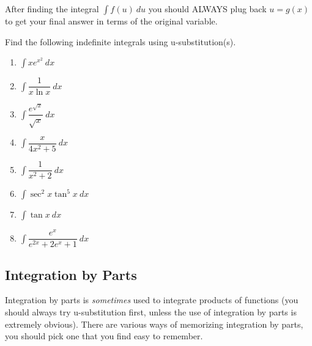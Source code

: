 \begin{remark}
	After finding the integral $\int f(u) \: du$ you should ALWAYS plug back $u = g(x)$ to get your final answer in terms of the original variable.
\end{remark}

\begin{exercise}
	Find the following indefinite integrals using u-substitution(s).
	\begin{multicols}{2}
		\begin{enumerate}
			\item $\int x e^{x^2} \: dx $
			\item $\int \dfrac{1}{x \ln x} \: dx$
			\item $\int \dfrac{e^{\sqrt{x}}}{\sqrt{x}} \: dx$
			\item $\int \dfrac{x}{4x^2+5} \: dx$
			\item $\int \dfrac{1}{x^2 + 2} \: dx$
			\item $\int \sec^2 x \tan^5 x \: dx$
			\item $\int \tan x \: dx$
			\item $\int \dfrac{e^x}{e^{2x} + 2e^x + 1} \: dx$
		\end{enumerate}
	\end{multicols}
\end{exercise}


\subsection{Integration by Parts}
Integration by parts is {\it sometimes} used to integrate products of functions (you should always try u-substitution first, unless the use of integration by parts is extremely obvious).
There are various ways of memorizing integration by parts, you should pick one that you find easy to remember.

